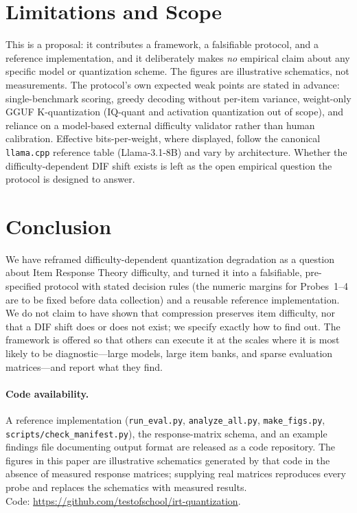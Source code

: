 \documentclass[11pt]{article}
\begin{document}
\section{Limitations and Scope}
This is a proposal: it contributes a framework, a falsifiable protocol, and a reference implementation, and it deliberately makes \emph{no} empirical claim about any specific model or quantization scheme. The figures are illustrative schematics, not measurements. The protocol's own expected weak points are stated in advance: single-benchmark scoring, greedy decoding without per-item variance, weight-only GGUF K-quantization (IQ-quant and activation quantization out of scope), and reliance on a model-based external difficulty validator rather than human calibration. Effective bits-per-weight, where displayed, follow the canonical \texttt{llama.cpp} reference table (Llama-3.1-8B) and vary by architecture. Whether the difficulty-dependent DIF shift exists is left as the open empirical question the protocol is designed to answer.

\section{Conclusion}
We have reframed difficulty-dependent quantization degradation as a question about Item Response Theory difficulty, and turned it into a falsifiable, pre-specified protocol with stated decision rules (the numeric margins for Probes~1--4 are to be fixed before data collection) and a reusable reference implementation. We do not claim to have shown that compression preserves item difficulty, nor that a DIF shift does or does not exist; we specify exactly how to find out. The framework is offered so that others can execute it at the scales where it is most likely to be diagnostic---large models, large item banks, and sparse evaluation matrices---and report what they find.

\paragraph{Code availability.} A reference implementation (\texttt{run\_eval.py}, \texttt{analyze\_all.py}, \texttt{make\_figs.py}, \texttt{scripts/check\_manifest.py}), the response-matrix schema, and an example findings file documenting output format are released as a code repository. The figures in this paper are illustrative schematics generated by that code in the absence of measured response matrices; supplying real matrices reproduces every probe and replaces the schematics with measured results.\\ Code: \url{https://github.com/testofschool/irt-quantization}.
\end{document}
